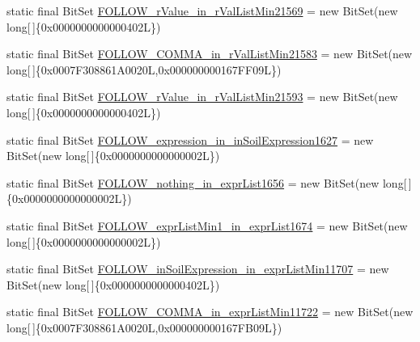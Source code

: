 \begin{DoxyCompactItemize}
\item 
static final Bit\-Set \hyperlink{classorg_1_1tzi_1_1use_1_1parser_1_1soil_1_1_soil_parser_a57d68dc236faae5b8020edac58c034ff}{F\-O\-L\-L\-O\-W\-\_\-r\-Value\-\_\-in\-\_\-r\-Val\-List\-Min21569} = new Bit\-Set(new long\mbox{[}$\,$\mbox{]}\{0x0000000000000402\-L\})
\item 
static final Bit\-Set \hyperlink{classorg_1_1tzi_1_1use_1_1parser_1_1soil_1_1_soil_parser_acf03dfe5495afdcba870d0b4846534ba}{F\-O\-L\-L\-O\-W\-\_\-\-C\-O\-M\-M\-A\-\_\-in\-\_\-r\-Val\-List\-Min21583} = new Bit\-Set(new long\mbox{[}$\,$\mbox{]}\{0x0007\-F308861\-A0020\-L,0x000000000167\-F\-F09\-L\})
\item 
static final Bit\-Set \hyperlink{classorg_1_1tzi_1_1use_1_1parser_1_1soil_1_1_soil_parser_a5baf8732660f5e41ecc28d26c8f6c29e}{F\-O\-L\-L\-O\-W\-\_\-r\-Value\-\_\-in\-\_\-r\-Val\-List\-Min21593} = new Bit\-Set(new long\mbox{[}$\,$\mbox{]}\{0x0000000000000402\-L\})
\item 
static final Bit\-Set \hyperlink{classorg_1_1tzi_1_1use_1_1parser_1_1soil_1_1_soil_parser_af560f445d10e86dac3c654b33c067f28}{F\-O\-L\-L\-O\-W\-\_\-expression\-\_\-in\-\_\-in\-Soil\-Expression1627} = new Bit\-Set(new long\mbox{[}$\,$\mbox{]}\{0x0000000000000002\-L\})
\item 
static final Bit\-Set \hyperlink{classorg_1_1tzi_1_1use_1_1parser_1_1soil_1_1_soil_parser_a8efa282e12f325797e29a4bb3e840bdc}{F\-O\-L\-L\-O\-W\-\_\-nothing\-\_\-in\-\_\-expr\-List1656} = new Bit\-Set(new long\mbox{[}$\,$\mbox{]}\{0x0000000000000002\-L\})
\item 
static final Bit\-Set \hyperlink{classorg_1_1tzi_1_1use_1_1parser_1_1soil_1_1_soil_parser_a80b01ca7e599edb38a66a04d2db7f69d}{F\-O\-L\-L\-O\-W\-\_\-expr\-List\-Min1\-\_\-in\-\_\-expr\-List1674} = new Bit\-Set(new long\mbox{[}$\,$\mbox{]}\{0x0000000000000002\-L\})
\item 
static final Bit\-Set \hyperlink{classorg_1_1tzi_1_1use_1_1parser_1_1soil_1_1_soil_parser_a64bc595b285f95283a3101f0ff50a074}{F\-O\-L\-L\-O\-W\-\_\-in\-Soil\-Expression\-\_\-in\-\_\-expr\-List\-Min11707} = new Bit\-Set(new long\mbox{[}$\,$\mbox{]}\{0x0000000000000402\-L\})
\item 
static final Bit\-Set \hyperlink{classorg_1_1tzi_1_1use_1_1parser_1_1soil_1_1_soil_parser_aa8b5141c24d6e7a3558d42f2fd7ddcc7}{F\-O\-L\-L\-O\-W\-\_\-\-C\-O\-M\-M\-A\-\_\-in\-\_\-expr\-List\-Min11722} = new Bit\-Set(new long\mbox{[}$\,$\mbox{]}\{0x0007\-F308861\-A0020\-L,0x000000000167\-F\-B09\-L\})
\item 

\end{DoxyCompactItemize}
